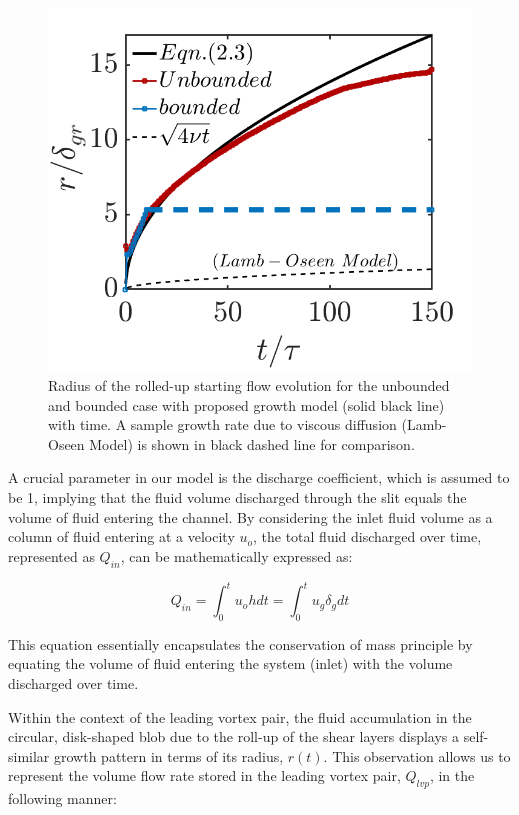\documentclass[final,3p,10pt,times,review,authoryear]{elsarticle}
\begin{document}
		\begin{figure}[h]
	\centering
	\begin{minipage}[c]{0.58\linewidth}
		\centering
		\includegraphics[width=1\linewidth] {Figures/radius_model2.png} 
	\end{minipage}
	\caption{Radius of the rolled-up starting flow evolution for the unbounded and bounded case with proposed growth model (solid black line) with time. A sample growth rate due to viscous diffusion (Lamb-Oseen Model) is shown in black dashed line for comparison.}
	\label{fig:model}
\end{figure}
	A crucial parameter in our model is the discharge coefficient, which is assumed to be 1, implying that the fluid volume discharged through the slit equals the volume of fluid entering the channel. By considering the inlet fluid volume as a column of fluid entering at a velocity $u_o$, the total fluid discharged over time, represented as $Q_{in}$, can be mathematically expressed as:
	
	\begin{equation}
		Q_{in}=\int_{0}^{t}u_o hdt = \int_{0}^{t}u_g \delta_gdt
		\label{eqn:Q_in}
	\end{equation}
	
	This equation essentially encapsulates the conservation of mass principle by equating the volume of fluid entering the system (inlet) with the volume discharged over time.
	
	Within the context of the leading vortex pair, the fluid accumulation in the circular, disk-shaped blob due to the roll-up of the shear layers displays a self-similar growth pattern in terms of its radius, $r(t)$. This observation allows us to represent the volume flow rate stored in the leading vortex pair, $Q_{lvp}$, in the following manner:
	
\end{document}
